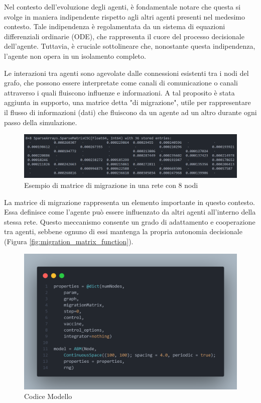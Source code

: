 Nel contesto dell'evoluzione degli agenti, è fondamentale notare che 
questa si svolge in maniera indipendente rispetto agli altri agenti 
presenti nel medesimo contesto. Tale indipendenza è regolamentata da un 
sistema di equazioni differenziali ordinarie (ODE), che rappresenta il 
cuore del processo decisionale dell'agente. 
Tuttavia, è cruciale sottolineare che, nonostante questa indipendenza, 
l'agente non opera in un isolamento completo.

Le interazioni tra agenti sono agevolate dalle connessioni esistenti 
tra i nodi del grafo, che possono essere interpretate come canali di 
comunicazione o canali attraverso i quali fluiscono influenze e 
informazioni. A tal proposito è stata aggiunta in supporto, una matrice
detta "di migrazione", utile per rappresentare il flusso di informazioni 
(dati) che fluiscono da un agente ad un altro durante ogni passo della
simulazione. 

\begin{figure}[H]
    \begin{center}
		\includegraphics[width=\textwidth]{img/Screenshot 2023-10-16 110330.png}
		\caption{Esempio di matrice di migrazione in una rete con 8 nodi}
		\label{fig:Migration_Matrix_example}
	\end{center}
\end{figure}

La matrice di migrazione rappresenta un elemento 
importante in questo contesto. Essa definisce come l'agente può essere 
influenzato da altri agenti all'interno della stessa rete. 
Questo meccanismo consente un grado di adattamento e cooperazione tra 
agenti, sebbene ognuno di essi mantenga la propria autonomia decisionale
(Figura \ref{fig:migration_matrix_function}).

\begin{figure}[H]
    \begin{center}
		\includegraphics[width=\textwidth]{img/sngraph_model.png}
		\caption{Codice Modello}
		\label{fig:Model_code}
	\end{center}
\end{figure}

